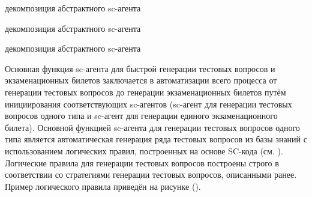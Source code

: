 
\begin{scnrelfromset}{декомпозиция абстрактного sc-агента}
	
	
	\begin{scnrelfromset}{декомпозиция абстрактного sc-агента}
	\end{scnrelfromset}
	
	
	\begin{scnrelfromset}{декомпозиция абстрактного sc-агента}
	\end{scnrelfromset}
	
\end{scnrelfromset}

Основная функция sc-агента для быстрой генерации тестовых вопросов и экзаменационных билетов заключается в автоматизации всего процесса от генерации тестовых вопросов до генерации экзаменационных билетов путём инициирования соответствующих sc-агентов (sc-агент для генерации тестовых вопросов одного типа и sc-агент для генерации единого экзаменационного билета). Основной функцией sc-агента для генерации тестовых вопросов одного типа является автоматическая генерация ряда тестовых вопросов из базы знаний с использованием логических правил, построенных на основе SC-кода (см. ). Логические правила для генерации тестовых вопросов построены строго в соответствии со стратегиями генерации тестовых вопросов, описанными ранее. Пример логического правила приведён на рисунке (\textit{}).

